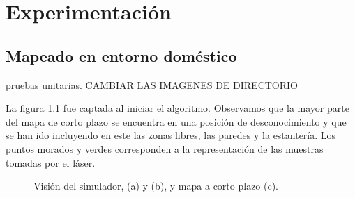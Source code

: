 \chapter{Experimentación}
\label{cap:experimentacion}

\section {Mapeado en entorno doméstico}
\label{cap:mapeadodomestico}

pruebas unitarias. CAMBIAR LAS IMAGENES DE DIRECTORIO


La figura \ref{fig:initserver} fue captada al iniciar el algoritmo. Observamos que la mayor parte del mapa de corto plazo se encuentra en una posición de desconocimiento y que se han ido incluyendo en este las zonas libres, las paredes y la estantería. Los puntos morados y verdes corresponden a la representación de las muestras tomadas por el láser.

\begin{figure}[H]
  \begin{center}
  \end{center}
  \caption{Visión del simulador, (a) y (b), y mapa a corto plazo (c).}
  \label{fig:initserver}
\end{figure}

